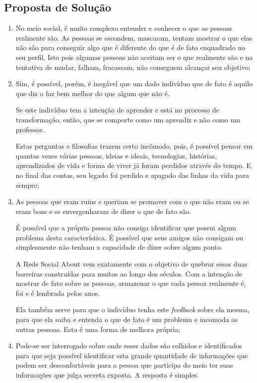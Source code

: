 \subsection{Proposta de Solução}
\label{sub:propostadesolucao}

\begin{enumerate}
    \item No meio social, é muito complexo entender e conhecer o que as 
        pessoas
        realmente são. As pessoas se escondem, mascaram, tentam mostrar o que elas não
        são para conseguir algo que é diferente do que é de fato enquadrado no seu
        perfil. Isto pois algumas pessoas não aceitam ser o que realmente são e na
        tentativa de mudar, falham, fracassam, não conseguem alcançar seu objetivo;

    \item Sim, é possível, porém, é inegável que um
        dado indivíduo que de fato é aquilo que diz o faz bem melhor do que algum
        que não é.

        Se este indivíduo tem a intenção de aprender e está no processo de transformação,
        então, que se comporte como um aprendiz e não como um professor.

        Estas perguntas e filosofias trazem certo incômodo, pois, é possível pensar em quantas 
        vezes várias
        pessoas, ideias e ideais, tecnologias, histórias, aprendizados de vida e forma de
        viver já foram perdidos através do tempo. E no final das contas, seu legado foi
        perdido e apagado das linhas da vida para sempre;

    \item As pessoas que eram ruins e queriam se promover com o que não eram 
        ou se eram boas e se envergonharam de dizer o que de fato são.

        É possível que a própria pessoa não consiga identificar que possui algum problema
        desta característica. É possível que seus amigos não
        consigam ou simplesmente não tenham a capacidade de dizer sobre algum ponto.

        A Rede Social About vem exatamente com o objetivo de quebrar essas duas barreiras construídas
        para muitos ao longo dos séculos. Com a intenção de mostrar de fato sobre as pessoas,
        armazenar o que cada pessoa realmente é, foi e é lembrada pelos anos.

        Ela também serve para que o indivíduo tenha este \textit{feedback} sobre ela mesma, para que ela
        saiba e entenda o que de fato é um problema e incomoda as outras pessoas. Esta é uma forma
        de melhora própria; 
    \item Pode-se ser interrogado sobre onde esses dados são colhidos e identificados para que seja
        possível identificar esta grande quantidade de informações que podem ser desconfortáveis
        para a pessoa que participa do meio ter suas informações que julga secreta exposta. A resposta
        é simples.


\end{enumerate}
